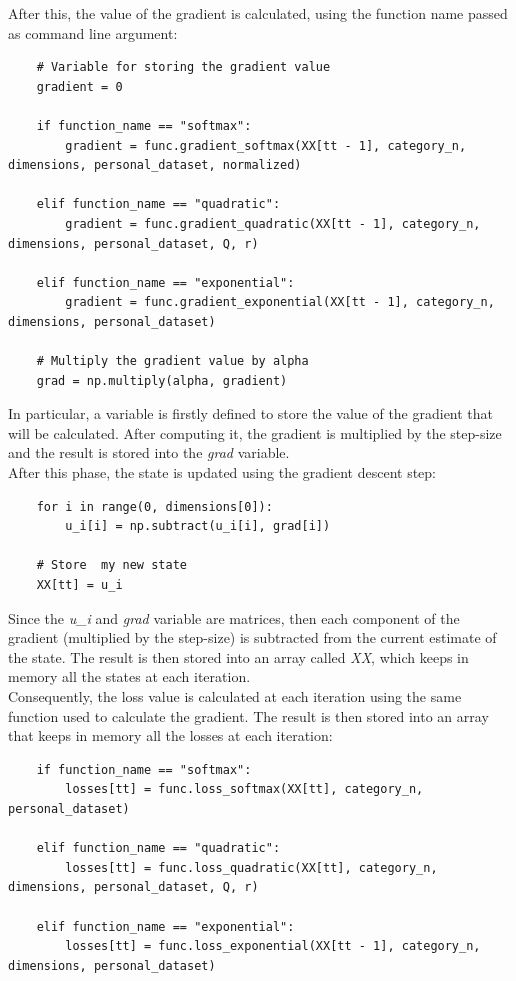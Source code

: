 \documentclass[a4paper,11pt,oneside]{book}
\begin{document}
After this, the value of the gradient is calculated, using the function name passed as command line argument:
\begin{lstlisting}
    # Variable for storing the gradient value    
    gradient = 0

    if function_name == "softmax":
        gradient = func.gradient_softmax(XX[tt - 1], category_n, dimensions, personal_dataset, normalized)
	
    elif function_name == "quadratic":
        gradient = func.gradient_quadratic(XX[tt - 1], category_n, dimensions, personal_dataset, Q, r)
	
    elif function_name == "exponential":
        gradient = func.gradient_exponential(XX[tt - 1], category_n, dimensions, personal_dataset)
	
    # Multiply the gradient value by alpha
    grad = np.multiply(alpha, gradient)
\end{lstlisting}
In particular, a variable is firstly defined to store the value of the gradient that will be calculated. After computing it, the gradient is multiplied by the step-size and the result is stored into the \textit{grad} variable. \\

After this phase, the state is updated using the gradient descent step:
\begin{lstlisting}
    for i in range(0, dimensions[0]):
        u_i[i] = np.subtract(u_i[i], grad[i])

    # Store  my new state
    XX[tt] = u_i
\end{lstlisting}
Since the \textit{u\_i} and \textit{grad} variable are matrices, then each component of the gradient (multiplied by the step-size) is subtracted from the current estimate of the state. The result is then stored into an array called \textit{XX}, which keeps in memory all the states at each iteration. \\

Consequently, the loss value is calculated at each iteration using the same function used to calculate the gradient. The result is then stored into an array that keeps in memory all the losses at each iteration:
\begin{lstlisting}
    if function_name == "softmax":
        losses[tt] = func.loss_softmax(XX[tt], category_n, personal_dataset)

    elif function_name == "quadratic":
        losses[tt] = func.loss_quadratic(XX[tt], category_n, dimensions, personal_dataset, Q, r)

    elif function_name == "exponential":
        losses[tt] = func.loss_exponential(XX[tt - 1], category_n, dimensions, personal_dataset)
\end{lstlisting}
\end{document}
